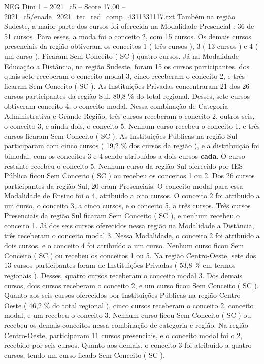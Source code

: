 \begin{textsample}{NEG Dim 1 – 2021\_c5 – Score 17.00 – 2021\_c5/enade\_2021\_tec\_red\_comp\_4311331117.txt}
Também na região Sudeste, a maior parte dos cursos foi oferecida na Modalidade Presencial : 36 de 51 cursos.
Para esses, a moda foi o conceito 2, com 15 cursos.
Os demais cursos presenciais da região obtiveram os conceitos 1 ( três cursos ), 3 ( 13 cursos ) e 4 ( um curso ).
Ficaram Sem Conceito ( SC ) quatro cursos.
Já na Modalidade Educação a Distância, na região Sudeste, foram 15 os cursos participantes, dos quais sete receberam o conceito modal 3, cinco receberam o conceito 2, e três ficaram Sem Conceito ( SC ).
As Instituições Privadas concentraram 21 dos 26 cursos participantes da região Sul, 80,8 \% do total regional.
Desses, sete cursos obtiveram conceito 4, o conceito modal.
Nessa combinação de Categoria Administrativa e Grande Região, três cursos receberam o conceito 2, outros seis, o conceito 3, e ainda dois, o conceito 5.
Nenhum curso recebeu o conceito 1, e três cursos ficaram Sem Conceito ( SC ).
As Instituições Públicas na região Sul participaram com cinco cursos ( 19,2 \% dos cursos da região ), e a distribuição foi bimodal, com os conceitos 3 e 4 sendo atribuídos a dois cursos \textbf{cada}.
O curso restante recebeu o conceito 5.
Nenhum curso da região Sul oferecido por IES Pública ficou Sem Conceito ( SC ) ou recebeu os conceitos 1 ou 2.
Dos 26 cursos participantes da região Sul, 20 eram Presenciais.
O conceito modal para essa Modalidade de Ensino foi o 4, atribuído a oito cursos.
O conceito 2 foi atribuído a um curso, o conceito 3, a cinco cursos, e o conceito 5, a três cursos.
Três cursos Presenciais da região Sul ficaram Sem Conceito ( SC ), e nenhum recebeu o conceito 1.
Já dos seis cursos oferecidos nessa região na Modalidade a Distância, três receberam o conceito modal 3.
Nessa Modalidade, o conceito 2 foi atribuído a dois cursos, e o conceito 4 foi atribuído a um curso.
Nenhum curso ficou Sem Conceito ( SC ) ou recebeu os conceitos 1 ou 5.
Na região Centro-Oeste, sete dos 13 cursos participantes foram de Instituições Privadas ( 53,8 \% em termos regionais ).
Desses, quatro cursos receberam o conceito modal 3.
Dos demais cursos, dois cursos receberam o conceito 2, e um curso ficou Sem Conceito ( SC ).
Quanto aos seis cursos oferecidos por Instituições Públicas na região Centro Oeste ( 46,2 \% do total regional ), cinco cursos receberam o conceito 2, conceito modal, e um recebeu o conceito 3.
Nenhum curso ficou Sem Conceito ( SC ) ou recebeu os demais conceitos nessa combinação de categoria e região.
Na região Centro-Oeste, participaram 11 cursos presenciais, e o conceito modal foi o 2, recebido por seis cursos.
Quanto aos demais, o conceito 3 foi atribuído a quatro cursos, tendo um curso ficado Sem Conceito ( SC ).

\end{textsample}
